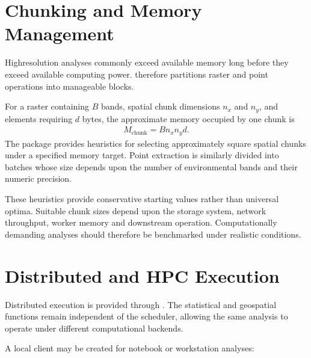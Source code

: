 \documentclass[letterpaper,10pt,english]{sphinxmanual}
\begin{document}
\section{Chunking and Memory Management}
\label{\detokenize{implementation:chunking-and-memory-management}}
\sphinxAtStartPar
High\sphinxhyphen{}resolution analyses commonly exceed available memory long before they exceed available computing power.  therefore partitions raster and point operations into manageable blocks.

\sphinxAtStartPar
For a raster containing \(B\) bands, spatial chunk dimensions \(n_x\) and \(n_y\), and elements requiring \(d\) bytes, the approximate memory occupied by one chunk is
\begin{equation*}
\begin{split}
M_{\mathrm{chunk}}
=
B n_x n_y d.
\end{split}
\end{equation*}
\sphinxAtStartPar
The package provides heuristics for selecting approximately square spatial chunks under a specified memory target. Point extraction is similarly divided into batches whose size depends upon the number of environmental bands and their numeric precision.

\sphinxAtStartPar
These heuristics provide conservative starting values rather than universal optima. Suitable chunk sizes depend upon the storage system, network throughput, worker memory and downstream operation. Computationally demanding analyses should therefore be benchmarked under realistic conditions.


\section{Distributed and HPC Execution}
\label{\detokenize{implementation:distributed-and-hpc-execution}}
\sphinxAtStartPar
Distributed execution is provided through . The statistical and geospatial functions remain independent of the scheduler, allowing the same analysis to operate under different computational backends.

\sphinxAtStartPar
A local client may be created for notebook or workstation analyses:

\begin{sphinxVerbatim}[commandchars=\\\{\}]
 

  
\end{sphinxVerbatim}
\end{document}
